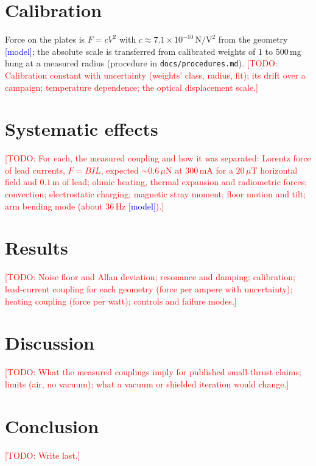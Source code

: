 \documentclass[11pt]{article}
\newcommand{\todo}[1]{\textcolor{red}{[TODO: #1]}}
\newcommand{\model}{\textcolor{blue}{[model]}}
\begin{document}
\section{Calibration}
Force on the plates is $F = cV^2$ with $c\approx7.1\times10^{-10}\,\mathrm{N/V^2}$ from the geometry \model; the absolute scale is transferred from calibrated weights of 1 to 500\,mg hung at a measured radius (procedure in \texttt{docs/procedures.md}). \todo{Calibration constant with uncertainty (weights' class, radius, fit); its drift over a campaign; temperature dependence; the optical displacement scale.}

\section{Systematic effects}
\todo{For each, the measured coupling and how it was separated: Lorentz force of lead currents, $F = BIL$, expected $\sim0.6\,\mu\mathrm{N}$ at $300\,\mathrm{mA}$ for a $20\,\mu\mathrm{T}$ horizontal field and $0.1\,\mathrm{m}$ of lead; ohmic heating, thermal expansion and radiometric forces; convection; electrostatic charging; magnetic stray moment; floor motion and tilt; arm bending mode (about 36\,Hz \model).}

\section{Results}
\todo{Noise floor and Allan deviation; resonance and damping; calibration; lead-current coupling for each geometry (force per ampere with uncertainty); heating coupling (force per watt); controls and failure modes.}

\section{Discussion}
\todo{What the measured couplings imply for published small-thrust claims; limits (air, no vacuum); what a vacuum or shielded iteration would change.}

\section{Conclusion}
\todo{Write last.}



\end{document}
